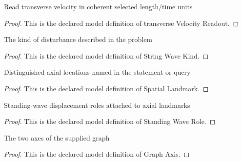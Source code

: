 \begin{definition}
  \label{def:physics:phyx-mini-0296:phyxminiproblems-problemphyxmini0296-transversevelocityreadout}
  Read transverse velocity in coherent selected length/time units
\end{definition}
\begin{proof}
  This is the declared model definition of transverse Velocity Readout.
\end{proof}
\begin{definition}
  \label{def:physics:phyx-mini-0296:phyxminiproblems-problemphyxmini0296-stringwavekind}
  The kind of disturbance described in the problem
\end{definition}
\begin{proof}
  This is the declared model definition of String Wave Kind.
\end{proof}
\begin{definition}
  \label{def:physics:phyx-mini-0296:phyxminiproblems-problemphyxmini0296-spatiallandmark}
  Distinguished axial locations named in the statement or query
\end{definition}
\begin{proof}
  This is the declared model definition of Spatial Landmark.
\end{proof}
\begin{definition}
  \label{def:physics:phyx-mini-0296:phyxminiproblems-problemphyxmini0296-standingwaverole}
  Standing-wave displacement roles attached to axial landmarks
\end{definition}
\begin{proof}
  This is the declared model definition of Standing Wave Role.
\end{proof}
\begin{definition}
  \label{def:physics:phyx-mini-0296:phyxminiproblems-problemphyxmini0296-graphaxis}
  The two axes of the supplied graph
\end{definition}
\begin{proof}
  This is the declared model definition of Graph Axis.
\end{proof}
